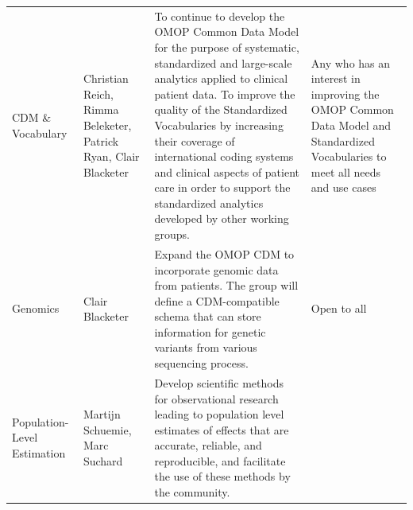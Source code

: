 \documentclass[11pt]{book}
\theoremstyle{definition}
\theoremstyle{definition}
\theoremstyle{definition}
\theoremstyle{remark}
\begin{document}
\begin{longtable}[]{@{}llll@{}}
\begin{minipage}[t]{0.22\columnwidth}
CDM \& Vocabulary\strut
\end{minipage} & \begin{minipage}[t]{0.22\columnwidth}\raggedright
Christian Reich, Rimma Beleketer, Patrick Ryan, Clair Blacketer\strut
\end{minipage} & \begin{minipage}[t]{0.22\columnwidth}\raggedright
To continue to develop the OMOP Common Data Model for the purpose of systematic, standardized and large-scale analytics applied to clinical patient data. To improve the quality of the Standardized Vocabularies by increasing their coverage of international coding systems and clinical aspects of patient care in order to support the standardized analytics developed by other working groups.\strut
\end{minipage} & \begin{minipage}[t]{0.22\columnwidth}\raggedright
Any who has an interest in improving the OMOP Common Data Model and Standardized Vocabularies to meet all needs and use cases\strut
\end{minipage}\tabularnewline
\begin{minipage}[t]{0.22\columnwidth}\raggedright
Genomics\strut
\end{minipage} & \begin{minipage}[t]{0.22\columnwidth}\raggedright
Clair Blacketer\strut
\end{minipage} & \begin{minipage}[t]{0.22\columnwidth}\raggedright
Expand the OMOP CDM to incorporate genomic data from patients. The group will define a CDM-compatible schema that can store information for genetic variants from various sequencing process.\strut
\end{minipage} & \begin{minipage}[t]{0.22\columnwidth}\raggedright
Open to all\strut
\end{minipage}\tabularnewline
\begin{minipage}[t]{0.22\columnwidth}\raggedright
Population-Level Estimation\strut
\end{minipage} & \begin{minipage}[t]{0.22\columnwidth}\raggedright
Martijn Schuemie, Marc Suchard\strut
\end{minipage} & \begin{minipage}[t]{0.22\columnwidth}\raggedright
Develop scientific methods for observational research leading to population level estimates of effects that are accurate, reliable, and reproducible, and facilitate the use of these methods by the community.\strut

\end{minipage}
\end{longtable}
\end{document}
